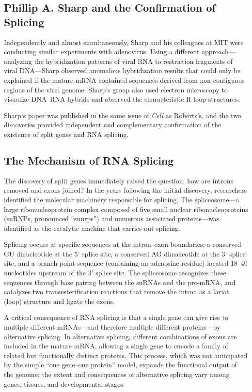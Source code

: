 \subsection{Phillip A. Sharp and the Confirmation of Splicing}

Independently and almost simultaneously, Sharp and his colleagues at MIT were conducting similar experiments with adenovirus. Using a different approach---analyzing the hybridization patterns of viral RNA to restriction fragments of viral DNA---Sharp observed anomalous hybridization results that could only be explained if the mature mRNA contained sequences derived from non-contiguous regions of the viral genome. Sharp's group also used electron microscopy to visualize DNA--RNA hybrids and observed the characteristic R-loop structures.

Sharp's paper was published in the same issue of \textit{Cell} as Roberts's, and the two discoveries provided independent and complementary confirmation of the existence of split genes and RNA splicing.

\subsection{The Mechanism of RNA Splicing}

The discovery of split genes immediately raised the question: how are introns removed and exons joined? In the years following the initial discovery, researchers identified the molecular machinery responsible for splicing. The spliceosome---a large ribonucleoprotein complex composed of five small nuclear ribonucleoproteins (snRNPs, pronounced ``snurps'') and numerous associated proteins---was identified as the catalytic machine that carries out splicing.

Splicing occurs at specific sequences at the intron--exon boundaries: a conserved GU dinucleotide at the 5' splice site, a conserved AG dinucleotide at the 3' splice site, and a branch point sequence (containing an adenosine residue) located 18--40 nucleotides upstream of the 3' splice site. The spliceosome recognizes these sequences through base pairing between the snRNAs and the pre-mRNA, and catalyzes two transesterification reactions that remove the intron as a lariat (loop) structure and ligate the exons.

A critical consequence of RNA splicing is that a single gene can give rise to multiple different mRNAs---and therefore multiple different proteins---by alternative splicing. In alternative splicing, different combinations of exons are included in the mature mRNA, allowing a single gene to encode a family of related but functionally distinct proteins. This process, which was not anticipated by the simple ``one gene--one protein'' model, expands the functional output of the genome; the extent and consequences of alternative splicing vary among genes, tissues, and developmental stages.

